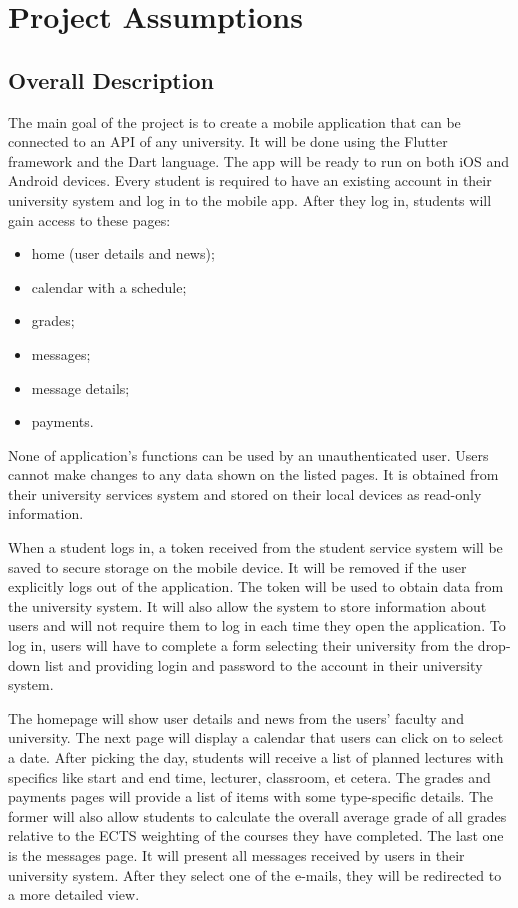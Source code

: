 \chapter{Project Assumptions}
\section{Overall Description}

The main goal of the project is to create a mobile application that can be connected to an API of any university. It will be done using the Flutter framework and the Dart language. The app will be ready to run on both iOS and Android devices. Every student is required to have an existing account in their university system and log in to the mobile app. After they log in, students will gain access to these pages:
\begin{multicols}{2}
\begin{itemize}
    \item home (user details and news);
    \item calendar with a schedule;
    \item grades;
    \item messages;
    \item message details;
    \item payments.
\end{itemize}
\end{multicols}
None of application's functions can be used by an unauthenticated user. Users cannot make changes to any data shown on the listed pages. It is obtained from their university services system and stored on their local devices as read-only information.

When a student logs in, a token received from the student service system will be saved to secure storage on the mobile device. It will be removed if the user explicitly logs out of the application. The token will be used to obtain data from the university system. It will also allow the system to store information about users and will not require them to log in each time they open the application. To log in, users will have to complete a form selecting their university from the drop-down list and providing login and password to the account in their university system.

The homepage will show user details and news from the users' faculty and university. The next page will display a calendar that users can click on to select a date. After picking the day, students will receive a list of planned lectures with specifics like start and end time, lecturer, classroom, et cetera. The grades and payments pages will provide a list of items with some type-specific details. The former will also allow students to calculate the overall average grade of all grades relative to the ECTS weighting of the courses they have completed. The last one is the messages page. It will present all messages received by users in their university system. After they select one of the e-mails, they will be redirected to a more detailed view.

